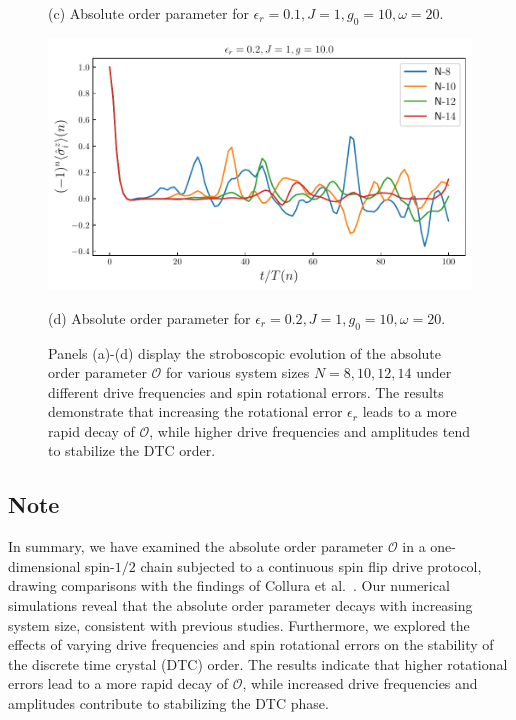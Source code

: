 \documentclass[a4paper, 11pt]{article}
\begin{document}
\begin{figure}[h!]
\begin{minipage}[t]{0.48\textwidth}
        \caption*{(c) Absolute order parameter for $\epsilon_r = 0.1, J = 1, g_0 = 10, \omega = 20$.}
    \end{minipage}
    \hfill
    \begin{minipage}[t]{0.48\textwidth}
        \centering
        \includegraphics[width=\textwidth]{figs/order_er0.2_J1_g10.0.pdf}
        \caption*{(d) Absolute order parameter for $\epsilon_r = 0.2, J = 1, g_0 = 10, \omega = 20$.}
    \end{minipage}
    \caption{Panels (a)-(d) display the stroboscopic evolution of the absolute order parameter $\mathcal{O}$ for various system sizes $N=8,10,12,14$ under different drive frequencies and spin rotational errors. The results demonstrate that increasing the rotational error $\epsilon_r$ leads to a more rapid decay of $\mathcal{O}$, while higher drive frequencies and amplitudes tend to stabilize the DTC order.}
\end{figure}

\subsection{Note}
In summary, we have examined the absolute order parameter $\mathcal{O}$ in a one-dimensional spin-$1/2$ chain subjected to a continuous spin flip drive protocol, drawing comparisons with the findings of Collura et al.~\cite{Collura2023}. Our numerical simulations reveal that the absolute order parameter decays with increasing system size, consistent with previous studies. Furthermore, we explored the effects of varying drive frequencies and spin rotational errors on the stability of the discrete time crystal (DTC) order. The results indicate that higher rotational errors lead to a more rapid decay of $\mathcal{O}$, while increased drive frequencies and amplitudes contribute to stabilizing the DTC phase. 



\printbibliography
\end{document}
